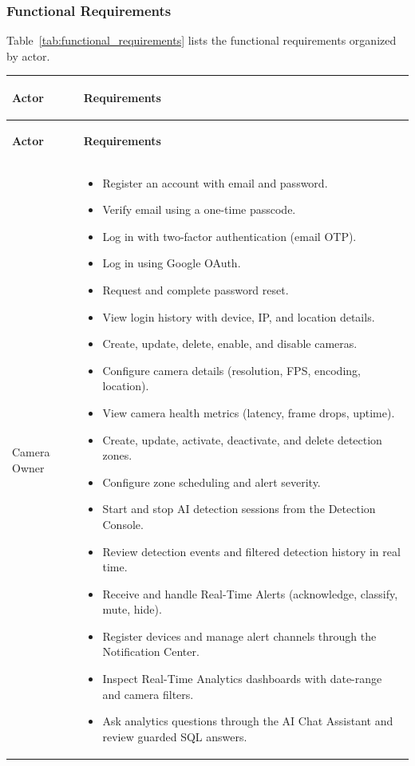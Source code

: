 \documentclass[12pt,a4paper,oneside]{report}
\newlength{\TblTwoKeyW}
\newlength{\TblTwoValW}
\begin{document}
\subsubsection{Functional Requirements}
\hspace{0.8cm}Table~\ref{tab:functional_requirements} lists the functional requirements organized by actor.

\begin{longtable}{|>{\bfseries\small\raggedright\arraybackslash}p{\TblTwoKeyW}|>{\raggedright\arraybackslash}p{\TblTwoValW}|}
\hline
\textbf{Actor} & \textbf{Requirements} \\
\hline
\endfirsthead
\hline
\textbf{Actor} & \textbf{Requirements} \\
\hline
\endhead
\hline
\endfoot
Camera Owner &
\begin{itemize}[nosep,leftmargin=1em]
  \item Register an account with email and password.
  \item Verify email using a one-time passcode.
  \item Log in with two-factor authentication (email OTP).
  \item Log in using Google OAuth.
  \item Request and complete password reset.
  \item View login history with device, IP, and location details.
  \item Create, update, delete, enable, and disable cameras.
  \item Configure camera details (resolution, FPS, encoding, location).
  \item View camera health metrics (latency, frame drops, uptime).
  \item Create, update, activate, deactivate, and delete detection zones.
  \item Configure zone scheduling and alert severity.
  \item Start and stop AI detection sessions from the Detection Console.
  \item Review detection events and filtered detection history in real time.
  \item Receive and handle Real-Time Alerts (acknowledge, classify, mute, hide).
  \item Register devices and manage alert channels through the Notification Center.
  \item Inspect Real-Time Analytics dashboards with date-range and camera filters.
  \item Ask analytics questions through the AI Chat Assistant and review guarded SQL answers.

\end{itemize}
\end{longtable}
\end{document}
